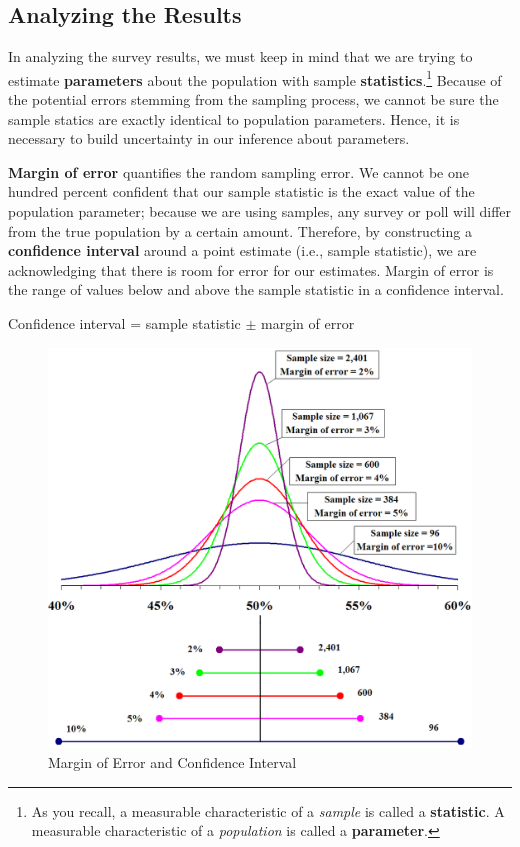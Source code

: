 \documentclass{book}
\begin{document}
\hypertarget{analyzing-the-results}{%
\subsection{\texorpdfstring{\textbf{Analyzing the
Results}}{Analyzing the Results}}\label{analyzing-the-results}}

In analyzing the survey results, we must keep in mind that we are trying to
estimate \textbf{parameters} about the population with sample
\textbf{statistics}.\footnote{As you recall, a measurable characteristic of a
  \emph{sample} is called a \textbf{statistic}. A measurable characteristic of
  a \emph{population} is called a \textbf{parameter}.} Because of the
potential errors stemming from the sampling process, we cannot be sure the
sample statics are exactly identical to population parameters. Hence, it is
necessary to build uncertainty in our inference about parameters.

\textbf{Margin of error} quantifies the random sampling error. We cannot be
one hundred percent confident that our sample statistic is the exact value of
the population parameter; because we are using samples, any survey or poll
will differ from the true population by a certain amount. Therefore, by
constructing a \textbf{confidence interval} around a point estimate (i.e.,
sample statistic), we are acknowledging that there is room for error for our
estimates. Margin of error is the range of values below and above the sample
statistic in a confidence interval.

Confidence interval = sample statistic \(\pm\) margin of error

\begin{figure}
\hypertarget{fig:Marginoferror}{%
\centering
\includegraphics{images/surveys/Marginoferror.png}
\caption{Margin of Error and Confidence Interval}\label{fig:Marginoferror}
}
\end{figure}
\end{document}
